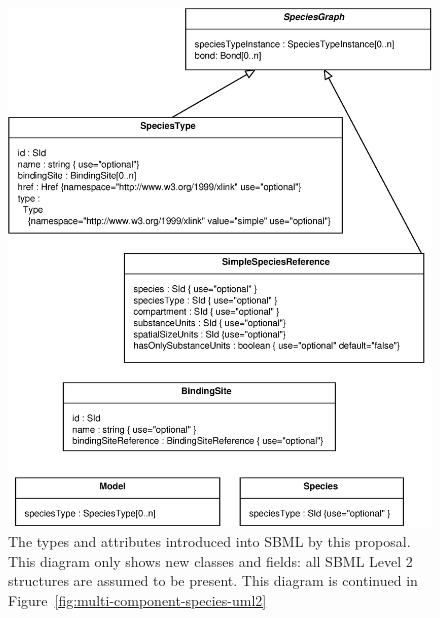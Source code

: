 \documentclass{cekarticle}
\begin{document}
\begin{figure}[h]
  \vspace*{8pt}
  \centering
  \includegraphics[scale = 0.7]{multi-component-species-uml.eps}
  \caption{The types and attributes introduced into SBML by this proposal.  This diagram
  only shows new classes and fields: all SBML Level 2 structures are assumed to be present.
  This diagram is continued in Figure~\ref{fig:multi-component-species-uml2}}
  \label{fig:multi-component-species-uml}
\end{figure}
\end{document}
